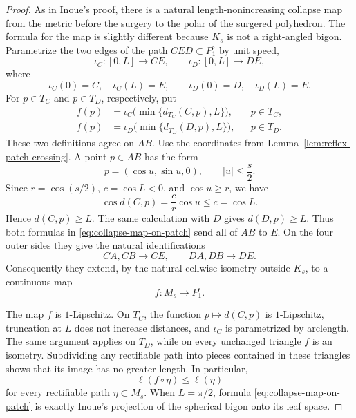 \documentclass[12pt,a4paper]{article}
\theoremstyle{definition}
\begin{document}
\begin{proof}
As in Inoue's proof, there is a natural length-nonincreasing collapse map
from the metric before the surgery to the polar of the surgered polyhedron.
The formula for the map is slightly different because \(K_s\) is not a
right-angled bigon.  Parametrize the two edges of the path \(CED\subset
P_1^\circ\) by unit speed,
\[
 \iota_C\colon[0,L]\longrightarrow CE,
 \qquad
 \iota_D\colon[0,L]\longrightarrow DE,
\]
where
\[
 \iota_C(0)=C,\quad \iota_C(L)=E,
 \qquad
 \iota_D(0)=D,\quad \iota_D(L)=E.
\]
For \(p\in T_C\) and \(p\in T_D\), respectively, put
\begin{equation}\label{eq:collapse-map-on-patch}
 \begin{aligned}
 f(p)&=\iota_C\bigl(\min\{d_{T_C}(C,p),L\}\bigr),
       &&p\in T_C,\\
 f(p)&=\iota_D\bigl(\min\{d_{T_D}(D,p),L\}\bigr),
       &&p\in T_D.
 \end{aligned}
\end{equation}
These two definitions agree on \(AB\).  Use the coordinates from
Lemma~\ref{lem:reflex-patch-crossing}.  A point \(p\in AB\) has the form
\[
        p=(\cos u,\sin u,0),\qquad |u|\le \frac{s}{2}.
\]
Since \(r=\cos(s/2)\), \(c=\cos L<0\), and \(\cos u\ge r\), we have
\[
 \cos d(C,p)=\frac{c}{r}\cos u\le c=\cos L.
\]
Hence \(d(C,p)\ge L\).  The same calculation with \(D\) gives
\(d(D,p)\ge L\).  Thus both formulas in
\eqref{eq:collapse-map-on-patch} send all of \(AB\) to \(E\).  On the four
outer sides they give the natural identifications
\[
        CA,CB\longrightarrow CE,
        \qquad
        DA,DB\longrightarrow DE.
\]
Consequently they extend, by the natural cellwise isometry outside \(K_s\),
to a continuous map
\begin{equation}\label{eq:collapse-map}
        f\colon M_s\longrightarrow P_1^\circ .
\end{equation}

The map \(f\) is \(1\)-Lipschitz.  On \(T_C\), the function
\(p\mapsto d(C,p)\) is \(1\)-Lipschitz, truncation at \(L\) does not increase
distances, and \(\iota_C\) is parametrized by arclength.  The same argument
applies on \(T_D\), while on every unchanged triangle \(f\) is an isometry.
Subdividing any rectifiable path into pieces contained in these triangles
shows that its image has no greater length.  In particular,
\begin{equation}\label{eq:collapse-map-length}
        \ell(f\circ\eta)\le \ell(\eta)
\end{equation}
for every rectifiable path \(\eta\subset M_s\).  When \(L=\pi/2\), formula
\eqref{eq:collapse-map-on-patch} is exactly Inoue's projection of the
spherical bigon onto its leaf space.


\end{proof}
\end{document}
